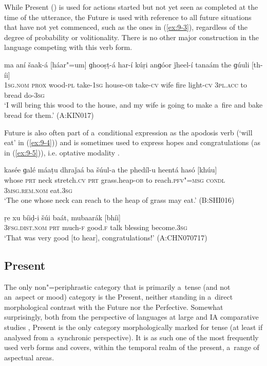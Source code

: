 While Present () is used for actions started but not yet seen as completed at the time of the utterance, the Future is used with reference to all future situations that have not yet commenced, such as the ones in (\ref{ex:9-3}), regardless of the degree of probability or volitionality. There is no other major construction in the language competing with this verb form.

\begin{exe}
\ex
\label{ex:9-3}
\gll ma aní šaak-á [háar"=um] ɡhooṣṭ-á har-í kúṛi anɡóor ǰheel-í tanaám the ɡúuli [th-íi] \\
\textsc{1sg.nom} \textsc{prox} wood-\textsc{pl} take-\textsc{1sg} house-\textsc{ob} take-\textsc{cv}  wife fire light-\textsc{cv } \textsc{3pl.acc} to bread do-\textsc{3sg} \\
\glt `I will bring this wood to the house, and my wife is going to make a~fire and bake bread for
them.' (A:KIN017)
\end{exe}

Future is also often part of a~conditional expression as the apodosis verb (`will eat' in (\ref{ex:9-4})) and is sometimes used to express hopes and congratulations (as in (\ref{ex:9-5})), i.e. optative modality \citep[179]{bybeeetal1994}.

\begin{exe}
\ex
\label{ex:9-4}
\gll kasée ɡalé máaṭu dhraǰaá ba šúul-a the phedíl-u heentá hasó [khúu] \\
whose \textsc{prt} neck stretch.\textsc{cv} \textsc{prt} grass.heap-\textsc{ob}  to reach.\textsc{pfv"=msg } \textsc{condl} \textsc{3msg.rem.nom} eat.\textsc{3sg} \\
\glt `The one whose neck can reach to the heap of grass may eat.' (B:SHI016)

\ex
\label{ex:9-5}
\gll ṛe xu bíiḍ-i šúi baát, mubaarák [bhíi] \\
\textsc{3fsg.dist.nom} \textsc{prt} much-\textsc{f} good.\textsc{f} talk blessing  become.\textsc{3sg} \\
\glt `That was very good [to hear], congratulations!' (A:CHN070717)
\end{exe}

\subsection{Present}
\label{subsec:9-1-3}

The only non"=periphrastic category that is primarily a~tense (and not an~aspect or mood) category is the Present, neither standing in a~direct morphological contrast with the Future nor the Perfective. Somewhat surprisingly, both from the perspective of languages at large \citep[103--128]{dahl1985} and IA comparative studies \citep[282, 288--289]{masica1991}, Present is the only category morphologically marked for tense (at least if analysed from a~synchronic perspective). It is as such one of the most frequently used verb forms and covers, within the temporal realm of the present, a~range of aspectual areas. 



